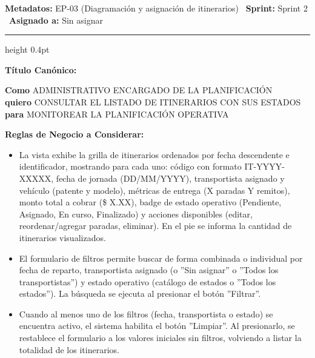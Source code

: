 \documentclass[a4paper,9pt]{article}
\begin{document}
\begin{tcolorbox}[hucard, title={\textbf{HU-60: LISTAR ITINERARIOS} \hfill \scriptsize \colorbox{tealstatus}{\textbf{\ Accepted\ }} \quad \colorbox{white}{\textcolor{primarydark}{\textbf{\ 2 pts\ }}}}]
\vspace{-1pt}
\noindent\textbf{\footnotesize Metadatos:} EP-03 (Diagramación y asignación de itinerarios) \textbar\ \textbf{Sprint:} Sprint 2 \textbar\ \textbf{Asignado a:} Sin asignar\par\vspace{2pt}
\hrule height 0.4pt\par\vspace{3pt}
\noindent\textbf{\footnotesize Título Canónico:}\par\vspace{1pt}
{\small \textbf{Como} ADMINISTRATIVO ENCARGADO DE LA PLANIFICACIÓN \\ \textbf{quiero} CONSULTAR EL LISTADO DE ITINERARIOS CON SUS ESTADOS \\ \textbf{para} MONITOREAR LA PLANIFICACIÓN OPERATIVA}\par\vspace{3pt}
\noindent\textbf{\footnotesize Reglas de Negocio a Considerar:}\par\vspace{1pt}
{\footnotesize
\begin{itemize}[leftmargin=12pt, nosep, itemsep=1.5pt, topsep=1pt]
\item La vista exhibe la grilla de itinerarios ordenados por fecha descendente e identificador, mostrando para cada uno: código con formato IT-YYYY-XXXXX, fecha de jornada (DD/MM/YYYY), transportista asignado y vehículo (patente y modelo), métricas de entrega (X paradas   Y remitos), monto total a cobrar (\$ X.XX), badge de estado operativo (Pendiente, Asignado, En curso, Finalizado) y acciones disponibles (editar, reordenar/agregar paradas, eliminar). En el pie se informa la cantidad de itinerarios visualizados.
\item El formulario de filtros permite buscar de forma combinada o individual por fecha de reparto, transportista asignado (o ''Sin asignar'' o ''Todos los transportistas'') y estado operativo (catálogo de estados o ''Todos los estados''). La búsqueda se ejecuta al presionar el botón ''Filtrar''.
\item Cuando al menos uno de los filtros (fecha, transportista o estado) se encuentra activo, el sistema habilita el botón ''Limpiar''. Al presionarlo, se restablece el formulario a los valores iniciales sin filtros, volviendo a listar la totalidad de los itinerarios.

\end{itemize}}
\end{tcolorbox}
\end{document}
